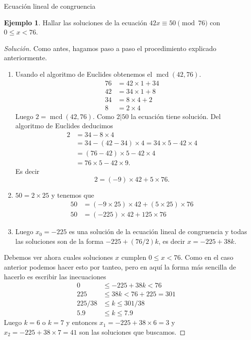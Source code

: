 \documentclass[11pt,spanish,makeidx]{amsbook}
\theoremstyle{definition}
\newtheorem{ejemplo}{Ejemplo}[section]
\theoremstyle{remark}
\newcommand \mcd{\operatorname{mcd}}
\begin{document}
\begin{section}{Ecuación lineal de congruencia}
\begin{ejemplo} Hallar las soluciones de la ecuación $42x\equiv
50 \pmod{76}$ con $0\le x< 76$.
\end{ejemplo}
\begin{proof}[Solución] Como antes, hagamos paso a paso el procedimiento explicado anteriormente.
\begin{enumerate}
\item 
Usando  el algoritmo de Euclides obtenemos el  $\mcd(42,76)$.
\begin{align*}
76 &=  42 \times 1 + 34 \\
42 &= 34 \times 1 + 8 \\
34 &= 8 \times 4 + 2 \\
8 &= 2 \times 4 
\end{align*}
Luego $2 = \mcd(42,76)$. Como $2|50$ la ecuación tiene solución. Del algoritmo de Euclides deducimos 
\begin{align*}
2 &= 34 - 8 \times 4\\
&= 34 - (42-34) \times 4 = 34\times 5 - 42\times 4\\
&= (76-42)\times 5 - 42\times 4 \\
&= 76\times 5 - 42\times 9. 
\end{align*}
Es decir
$$
2 = (-9) \times 42 + 5 \times 76.
$$

\item $50 = 2\times 25$ y tenemos  que 
\begin{align*}
50 &= (-9\times 25) \times 42 + (5 \times 25) \times 76 \\
50 &= (-225) \times 42 + 125 \times 76
\end{align*}
\item Luego $x_0 = -225$ es una solución de la ecuación lineal de congruencia y todas las soluciones son de la forma $-225 + (76/2)k$, es decir $x = -225 + 38k$.
\end{enumerate}
Debemos ver ahora cuales soluciones $x$ cumplen $0\le x< 76$. Como en el caso anterior podemos hacer esto por tanteo, pero en aquí la forma más sencilla de hacerlo es escribir las inecuaciones
\begin{align*}
0&\le -225 + 38k < 76 \\
225&\le 38k < 76+225= 301 \\
225/38 &\le k \le 301/38 \\
5.9 &\le k \le 7.9
\end{align*}
Luego $k = 6$ o $k =7$ y entonces $x_1 = -225 + 38\times 6 = 3$ y $x_2 = -225 + 38\times 7 = 41$ son las soluciones que buscamos. 
\end{proof}


\end{section}
\end{document}

